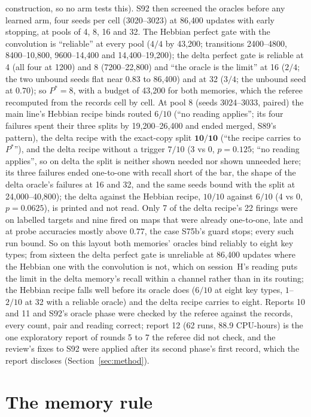 \documentclass[11pt]{article}
\begin{document}
construction, so no arm tests this). S92 then screened the oracles before any learned arm, four seeds per cell (3020--3023) at 86{,}400 updates with early stopping, at pools of 4, 8, 16 and 32. The Hebbian perfect gate with the convolution is ``reliable'' at every pool ($4/4$ by 43{,}200; transitions 2400--4800, 8400--10{,}800, 9600--14{,}400 and 14{,}400--19{,}200); the delta perfect gate is reliable at 4 (all four at 1200) and 8 (7200--22{,}800) and ``the oracle is the limit'' at 16 ($2/4$; the two unbound seeds flat near $0.83$ to 86{,}400) and at 32 ($3/4$; the unbound seed at $0.70$); so $P^\ast = 8$, with a budget of 43{,}200 for both memories, which the referee recomputed from the records cell by cell. At pool 8 (seeds 3024--3033, paired) the main line's Hebbian recipe binds routed $6/10$ (``no reading applies''; its four failures spent their three splits by 19{,}200--26{,}400 and ended merged, S89's pattern), the delta recipe with the exact-copy split $\mathbf{10/10}$ (``the recipe carries to $P^\ast$''), and the delta recipe without a trigger $7/10$ (3 vs 0, $p = 0.125$; ``no reading applies'', so on delta the split is neither shown needed nor shown unneeded here; its three failures ended one-to-one with recall short of the bar, the shape of the delta oracle's failures at 16 and 32, and the same seeds bound with the split at 24{,}000--40{,}800); the delta against the Hebbian recipe, $10/10$ against $6/10$ (4 vs 0, $p = 0.0625$), is printed and not read. Only 7 of the delta recipe's 22 firings were on labelled targets and nine fired on maps that were already one-to-one, late and at probe accuracies mostly above $0.77$, the case S75b's guard stops; every such run bound. So on this layout both memories' oracles bind reliably to eight key types; from sixteen the delta perfect gate is unreliable at 86{,}400 updates where the Hebbian one with the convolution is not, which on session~H's reading puts the limit in the delta memory's recall within a channel rather than in its routing; the Hebbian recipe falls well before its oracle does ($6/10$ at eight key types, $1$--$2/10$ at 32 with a reliable oracle) and the delta recipe carries to eight. Reports 10 and 11 and S92's oracle phase were checked by the referee against the records, every count, pair and reading correct; report 12 (62 runs, 88.9 CPU-hours) is the one exploratory report of rounds 5 to 7 the referee did not check, and the review's fixes to S92 were applied after its second phase's first record, which the report discloses (Section~\ref{sec:method}).

\section{The memory rule}
\label{sec:memory}
\end{document}
